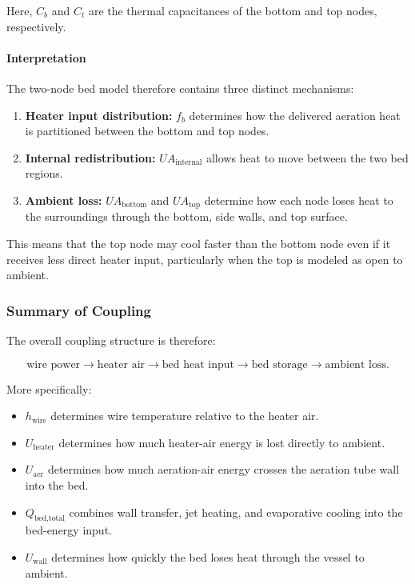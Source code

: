 \documentclass{article}
\begin{document}
Here, $C_b$ and $C_t$ are the thermal capacitances of the bottom and top
nodes, respectively.

\paragraph{Interpretation}

The two-node bed model therefore contains three distinct mechanisms:

\begin{enumerate}
\item \textbf{Heater input distribution:} $f_b$ determines how the delivered
      aeration heat is partitioned between the bottom and top nodes.
\item \textbf{Internal redistribution:} $UA_{\text{internal}}$ allows heat to
      move between the two bed regions.
\item \textbf{Ambient loss:} $UA_{\text{bottom}}$ and $UA_{\text{top}}$
      determine how each node loses heat to the surroundings through the
      bottom, side walls, and top surface.
\end{enumerate}

This means that the top node may cool faster than the bottom node even if it
receives less direct heater input, particularly when the top is modeled as
open to ambient.

\subsubsection{Summary of Coupling}

The overall coupling structure is therefore:

\begin{equation}
\text{wire power}
\rightarrow
\text{heater air}
\rightarrow
\text{bed heat input}
\rightarrow
\text{bed storage}
\rightarrow
\text{ambient loss}.
\end{equation}

More specifically:
\begin{itemize}
\item $h_{\text{wire}}$ determines wire temperature relative to the heater
      air.
\item $U_{\text{heater}}$ determines how much heater-air energy is lost
      directly to ambient.
\item $U_{\text{aer}}$ determines how much aeration-air energy crosses the
      aeration tube wall into the bed.
\item $Q_{\text{bed,total}}$ combines wall transfer, jet heating, and
      evaporative cooling into the bed-energy input.
\item $U_{\text{wall}}$ determines how quickly the bed loses heat through the
      vessel to ambient.
\end{itemize}
\end{document}
